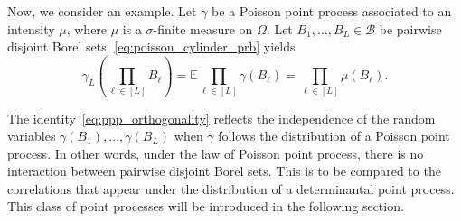\documentclass[twoside,11pt]{book}
\numberwithin{theorem}{chapter}
\numberwithin{definition}{chapter}
\numberwithin{proposition}{chapter}
\numberwithin{corollary}{chapter}
\numberwithin{example}{chapter}
\numberwithin{lemma}{chapter}
\begin{document}
















Now, we consider an example. Let $\gamma$ be a Poisson point process associated to an intensity $\mu$, where $\mu$ is a $\sigma$-finite measure on $\Omega$. Let $B_{1}, \dots, B_{L} \in \mathcal{B}$ be pairwise disjoint Borel sets. \eqref{eq:poisson_cylinder_prb} yields
\begin{equation}\label{eq:ppp_orthogonality}
\gamma_{L}(\prod\limits_{\ell \in [L]} B_\ell) =  \mathbb{E} \prod\limits_{\ell \in [L]} \gamma(B_\ell) = \prod\limits_{\ell \in [L]}\mu(B_\ell).
\end{equation}

The identity~\eqref{eq:ppp_orthogonality} reflects the independence of the random variables $\gamma(B_{1}), \dots, \gamma(B_L)$ when $\gamma$ follows the distribution of a Poisson point process. In other words, under the law of Poisson point process, there is no interaction between pairwise disjoint Borel sets.  This is to be compared to the correlations that appear under the distribution of a determinantal point process. This class of point processes will be introduced in the following section.
\end{document}
